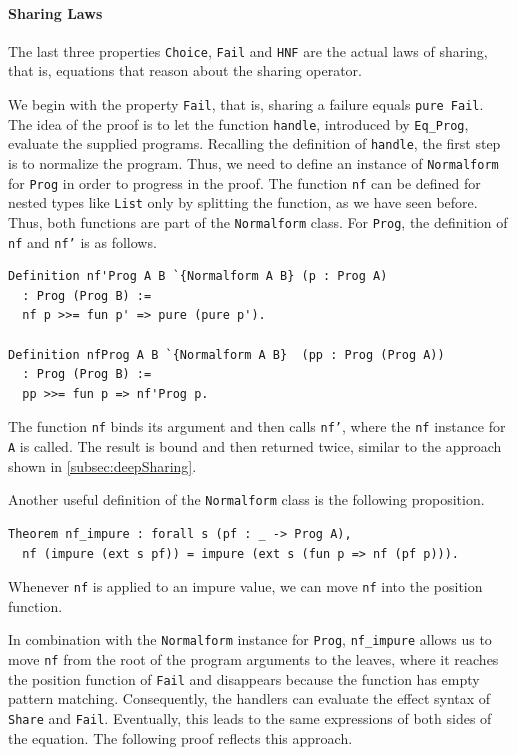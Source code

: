 \documentclass[a4paper, 11pt, fleqn, twoside, abstract=on]{scrreprt}
\newcommand{\cinl}[1]{\texttt{#1}}
\begin{document}
\paragraph{Sharing Laws}
The last three properties \cinl{Choice}, \cinl{Fail} and \cinl{HNF} are the actual laws of sharing, that is, equations that reason about the sharing operator.

We begin with the property \cinl{Fail}, that is, sharing a failure equals \cinl{pure Fail}.
The idea of the proof is to let the function \cinl{handle}, introduced by \cinl{Eq_Prog}, evaluate the supplied programs.
Recalling the definition of \cinl{handle}, the first step is to normalize the program.
Thus, we need to define an instance of \cinl{Normalform} for \cinl{Prog} in order to progress in the proof.
The function \cinl{nf} can be defined for nested types like \cinl{List} only by splitting the function, as we have seen before.
Thus, both functions are part of the \cinl{Normalform} class.
For \cinl{Prog}, the definition of \cinl{nf} and \cinl{nf'} is as follows.

\begin{verbatim}
Definition nf'Prog A B `{Normalform A B} (p : Prog A) 
  : Prog (Prog B) :=
  nf p >>= fun p' => pure (pure p').

Definition nfProg A B `{Normalform A B}  (pp : Prog (Prog A)) 
  : Prog (Prog B) :=
  pp >>= fun p => nf'Prog p.
\end{verbatim}

The function \cinl{nf} binds its argument and then calls \cinl{nf'}, where the \cinl{nf} instance for \cinl{A} is called.
The result is bound and then returned twice, similar to the approach shown in \autoref{subsec:deepSharing}.

Another useful definition of the \cinl{Normalform} class is the following proposition.

\begin{verbatim}
Theorem nf_impure : forall s (pf : _ -> Prog A),
  nf (impure (ext s pf)) = impure (ext s (fun p => nf (pf p))).
\end{verbatim}
\noindent
Whenever \cinl{nf} is applied to an impure value, we can move \cinl{nf} into the position function.

In combination with the \cinl{Normalform} instance for \cinl{Prog}, \cinl{nf_impure} allows us to move \cinl{nf} from the root of the program arguments to the leaves, where it reaches the position function of \cinl{Fail} and disappears because the function has empty pattern matching.
Consequently, the handlers can evaluate the effect syntax of \cinl{Share} and \cinl{Fail}.
Eventually, this leads to the same expressions of both sides of the equation.
The following proof reflects this approach.
\end{document}

